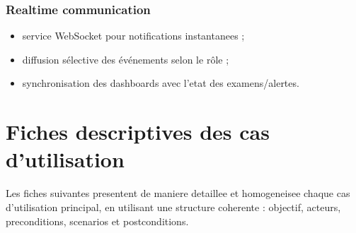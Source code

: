 \subsubsection*{Realtime communication}
\begin{itemize}
    \item service WebSocket pour notifications instantanees ;
    \item diffusion sélective des événements selon le rôle ;
    \item synchronisation des dashboards avec l'etat des examens/alertes.
\end{itemize}

\section{Fiches descriptives des cas d'utilisation}
Les fiches suivantes presentent de maniere detaillee et homogeneisee chaque cas d'utilisation principal,
en utilisant une structure coherente : objectif, acteurs, preconditions, scenarios et postconditions.

